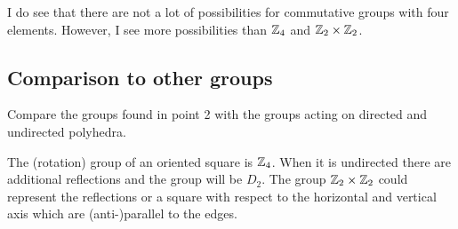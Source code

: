 \documentclass[11pt, ngerman, fleqn, DIV=15, headinclude, BCOR=1cm]{scrartcl}
\begin{document}
I do see that there are not a lot of possibilities for commutative groups with
four elements. However, I see more possibilities than $\mathbb Z_4$ and $\mathbb Z_2 \times
\mathbb Z_2$.

\subsection{Comparison to other groups}

\begin{problem}
    Compare the groups found in point 2 with the groups acting on directed and
    undirected polyhedra.
\end{problem}

The (rotation) group of an oriented square is $\mathbb Z_4$. When it is undirected
there are additional reflections and the group will be $D_2$. The group $\mathbb Z_2
\times \mathbb Z_2$ could represent the reflections or a square with respect to the
horizontal and vertical axis which are (anti-)parallel to the edges.
\end{document}
